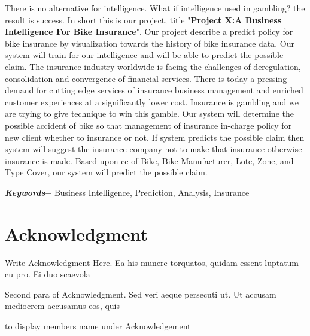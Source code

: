 There is no alternative for intelligence. What if intelligence used in gambling? the result is success. In short this is our project, title "\textbf{Project X:A Business Intelligence For Bike Insurance}". Our project describe a predict policy for bike insurance by visualization towards the history of bike insurance data. Our system will train for our intelligence and will be able to predict the possible claim. The insurance industry worldwide is facing the challenges of deregulation, consolidation and convergence of financial services. There is today a pressing demand for cutting edge services of insurance business management and enriched customer experiences at a significantly lower cost. Insurance is gambling and we are trying to give technique to win this gamble. Our system will determine the possible accident of bike so that management of insurance in-charge policy for new client whether to insurance or not. If system predicts the possible claim then system will suggest the insurance company not to make that insurance otherwise insurance is made. Based upon \acs{cc} of Bike, Bike Manufacturer, Lote, Zone, and Type Cover, our system will predict the possible claim.
\par
\textbf{\textit{Keywords$-$}} Business Intelligence, Prediction, Analysis, Insurance 

\chapter*{Acknowledgment}
Write Acknowledgment Here. Ea his munere torquatos, quidam essent luptatum cu pro. Ei duo scaevola %
\par
Second para of Acknowledgment. Sed veri aeque persecuti ut. Ut accusam mediocrem accusamus eos, quis %

to display members name under Acknowledgement
\begin{flushright}
\vskip -20pt
\submittedBy
\end{flushright}


